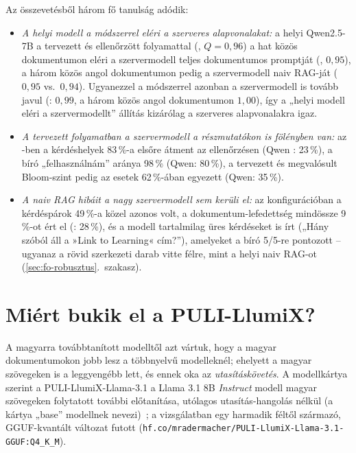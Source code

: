 Az összevetésből három fő tanulság adódik:
\begin{itemize}[leftmargin=*,itemsep=2pt,topsep=2pt]
\item \emph{A helyi modell a módszerrel eléri a szerveres alapvonalakat:} a helyi Qwen2.5-7B a tervezett és ellenőrzött folyamattal (, $Q=0{,}96$) a hat közös dokumentumon eléri a szervermodell teljes dokumentumos promptját (, $0{,}95$), a három közös angol dokumentumon pedig a szervermodell naiv RAG-ját ($0{,}95$ vs.\ $0{,}94$). Ugyanezzel a módszerrel azonban a szervermodell is tovább javul (: $0{,}99$, a három közös angol dokumentumon $1{,}00$), így a „helyi modell eléri a szervermodellt” állítás kizárólag a szerveres alapvonalakra igaz.
\item \emph{A tervezett folyamatban a szervermodell a részmutatókon is fölényben van:} az -ben a kérdéshelyek 83\,\%-a elsőre átment az ellenőrzésen (Qwen : 23\,\%), a bíró „felhasználnám” aránya 98\,\% (Qwen: 80\,\%), a tervezett és megvalósult Bloom-szint pedig az esetek 62\,\%-ában egyezett (Qwen: 35\,\%).
\item \emph{A naiv RAG hibáit a nagy szervermodell sem kerüli el:} az  konfigurációban a kérdéspárok 49\,\%-a közel azonos volt, a dokumentum-lefedettség mindössze 9\,\%-ot ért el (: 28\,\%), és a modell tartalmilag üres kérdéseket is írt („Hány szóból áll a »Link to Learning« cím?”), amelyeket a bíró 5/5-re pontozott -- ugyanaz a rövid szerkezeti darab vitte félre, mint a helyi naiv RAG-ot (\ref{sec:fo-robusztus}.~szakasz).
\end{itemize}

\section{Miért bukik el a PULI-LlumiX?}
\label{sec:fo-puli}

A magyarra továbbtanított modelltől azt vártuk, hogy a magyar dokumentumokon jobb lesz a többnyelvű
modelleknél; ehelyett a magyar szövegeken is a leggyengébb lett, és ennek oka az \emph{utasításkövetés}. A
modellkártya szerint a PULI-LlumiX-Llama-3.1 a Llama 3.1 8B \emph{Instruct} modell magyar szövegeken folytatott
további előtanítása, utólagos utasítás-hangolás nélkül (a kártya „base” modellnek nevezi)~\cite{pulillumix}; a
vizsgálatban egy harmadik féltől származó, GGUF-kvantált változat futott
({\small\nolinkurl{hf.co/mradermacher/PULI-LlumiX-Llama-3.1-GGUF:Q4_K_M}}).

